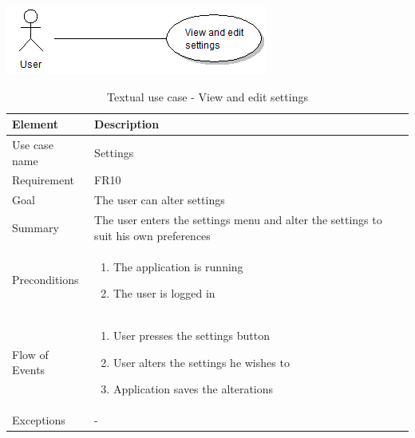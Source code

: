 \begin{table}
\begin{center}
\begin{center}
\includegraphics[width=\textwidth]{settings}
\end{center}
\begin{tabular}{p{3cm}|p{12cm}} \hline
\textbf{Element} & \textbf{Description} \\ \hline \hline
Use case name & Settings \\ 
Requirement & FR10 \\
Goal & The user can alter settings \\ \hline
Summary & The user enters the settings menu and alter the settings to suit his own preferences \\ \hline
Preconditions &
\begin{enumerate}
\item{}The application is running
\item{}The user is logged in
\end{enumerate} \\ \hline
Flow of Events &
\begin{enumerate}
\item{}User presses the settings button
\item{}User alters the settings he wishes to
\item{}Application saves the alterations
\end{enumerate} \\ \hline
Exceptions & - \\ \hline
\end{tabular}
\end{center}
\caption{Textual use case - View and edit settings} \label{tab:settings}
\end{table}
